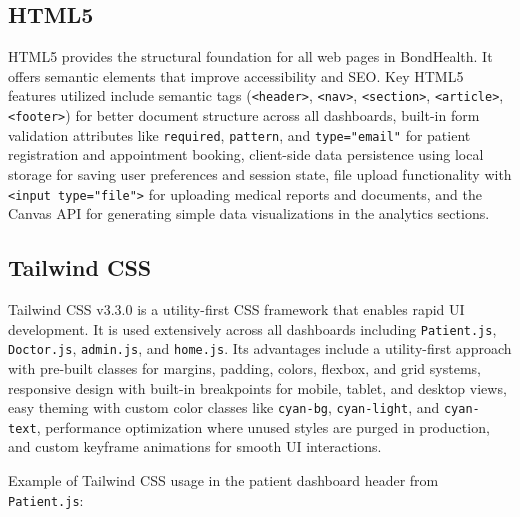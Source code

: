 \subsection{HTML5}

\justifying
\noindent HTML5 provides the structural foundation for all web pages in BondHealth. It offers semantic elements that improve accessibility and SEO. Key HTML5 features utilized include semantic tags (\texttt{<header>}, \texttt{<nav>}, \texttt{<section>}, \texttt{<article>}, \texttt{<footer>}) for better document structure across all dashboards, built-in form validation attributes like \texttt{required}, \texttt{pattern}, and \texttt{type="email"} for patient registration and appointment booking, client-side data persistence using local storage for saving user preferences and session state, file upload functionality with \texttt{<input type="file">} for uploading medical reports and documents, and the Canvas API for generating simple data visualizations in the analytics sections.

\subsection{Tailwind CSS}

\justifying
\noindent Tailwind CSS v3.3.0 is a utility-first CSS framework that enables rapid UI development. It is used extensively across all dashboards including \texttt{Patient.js}, \texttt{Doctor.js}, \texttt{admin.js}, and \texttt{home.js}. Its advantages include a utility-first approach with pre-built classes for margins, padding, colors, flexbox, and grid systems, responsive design with built-in breakpoints for mobile, tablet, and desktop views, easy theming with custom color classes like \texttt{cyan-bg}, \texttt{cyan-light}, and \texttt{cyan-text}, performance optimization where unused styles are purged in production, and custom keyframe animations for smooth UI interactions.

\noindent Example of Tailwind CSS usage in the patient dashboard header from \texttt{Patient.js}:

